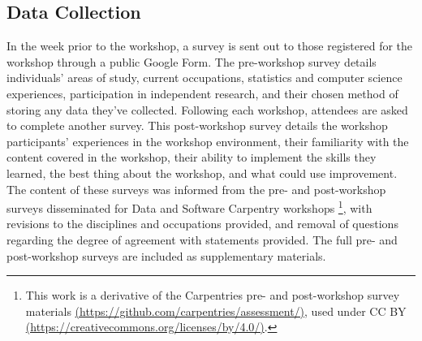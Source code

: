 \documentclass[12pt]{article}
\begin{document}
\subsection{Data Collection}

\quad  In the week prior to the workshop, a survey is sent out to those registered for the workshop through a public Google Form. The pre-workshop survey details individuals' areas of study, current occupations, statistics and computer science experiences, participation in independent research, and their chosen method of storing any data they've collected. Following each workshop, attendees are asked to complete another survey. This post-workshop survey details the workshop participants' experiences in the workshop environment, their familiarity with the content covered in the workshop, their ability to implement the skills they learned, the best thing about the workshop, and what could use improvement. The content of these surveys was informed from the pre- and post-workshop surveys disseminated for Data and Software Carpentry workshops \footnote{This work is a derivative of the Carpentries pre- and post-workshop survey materials \href{https://github.com/carpentries/assessment/}{(https://github.com/carpentries/assessment/)}, used under CC BY \href{https://creativecommons.org/licenses/by/4.0/}{(https://creativecommons.org/licenses/by/4.0/)}.}, with revisions to the disciplines and occupations provided, and removal of questions regarding the degree of agreement with statements provided. The full pre- and post-workshop surveys are included as supplementary materials.

% 
% 
\end{document}
